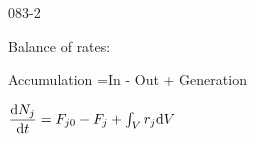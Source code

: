 \begin{mitframe}{083-2}
        
\begin{listone}
	\item Balance of rates:
	\item Accumulation =In - Out + Generation
	\item $\dfrac{\mathrm{d}\massspecflux{j}}{\mathrm{d}\timet}=\force_{j0}-\force_j+\int_{\vol}\pos_j\mathrm{d}\vol$

\end{listone}        
\end{mitframe}